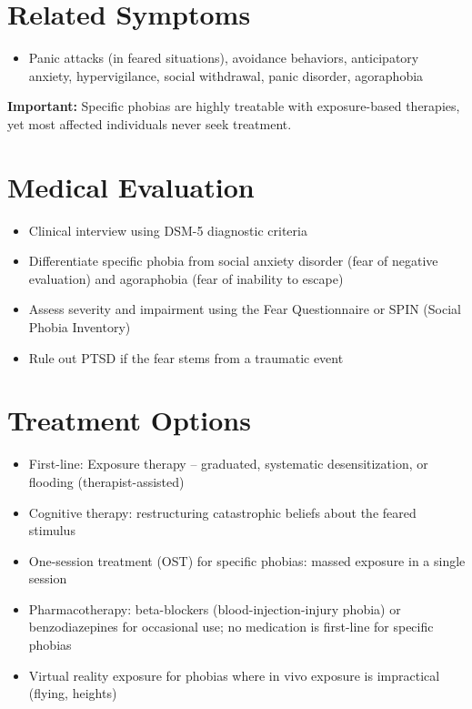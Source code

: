 \section*{Related Symptoms}
\begin{itemize}
  \item Panic attacks (in feared situations), avoidance behaviors, anticipatory anxiety, hypervigilance, social withdrawal, panic disorder, agoraphobia
\end{itemize}
\textbf{Important:} Specific phobias are highly treatable with exposure-based therapies, yet most affected individuals never seek treatment.

\section*{Medical Evaluation}
\begin{itemize}
  \item Clinical interview using DSM-5 diagnostic criteria
  \item Differentiate specific phobia from social anxiety disorder (fear of negative evaluation) and agoraphobia (fear of inability to escape)
  \item Assess severity and impairment using the Fear Questionnaire or SPIN (Social Phobia Inventory)
  \item Rule out PTSD if the fear stems from a traumatic event
\end{itemize}

\section*{Treatment Options}
\begin{itemize}
  \item First-line: Exposure therapy -- graduated, systematic desensitization, or flooding (therapist-assisted)
  \item Cognitive therapy: restructuring catastrophic beliefs about the feared stimulus
  \item One-session treatment (OST) for specific phobias: massed exposure in a single session
  \item Pharmacotherapy: beta-blockers (blood-injection-injury phobia) or benzodiazepines for occasional use; no medication is first-line for specific phobias
  \item Virtual reality exposure for phobias where in vivo exposure is impractical (flying, heights)
\end{itemize}

